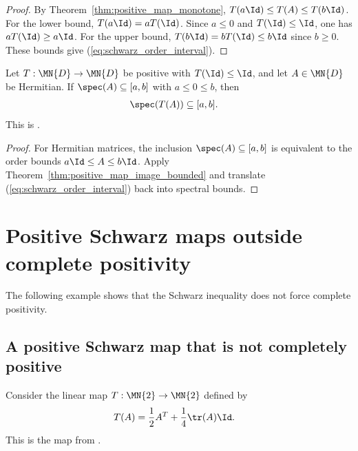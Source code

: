\begin{proof}
    \leanok
    By Theorem~\ref{thm:positive_map_monotone},
    $T(a\Id)\le T(A)\le T(b\Id)$.
    For the lower bound, $T(a\Id)=aT(\Id)$.
    Since $a\le0$ and $T(\Id)\le\Id$, one has $aT(\Id)\ge a\Id$.
    For the upper bound, $T(b\Id)=bT(\Id)\le b\Id$ since $b\ge0$.
    These bounds give (\ref{eq:schwarz_order_interval}).
\end{proof}

\begin{theorem}
    \label{thm:positive_map_spectrum_contractivity}
    \leanok
    Let $T:\MN{D}\to\MN{D}$ be positive with $T(\Id)\le\Id$, and let
    $A\in\MN{D}$ be Hermitian.
    If $\spec(A)\subseteq[a,b]$ with $a\le0\le b$, then
    \begin{align}
        \spec(T(A))
         & \subseteq[a,b].
        \notag
    \end{align}
    This is \cite[Equation~(5.21)]{Wolf2012Quantum}.
\end{theorem}

\begin{proof}
    \leanok
    For Hermitian matrices, the inclusion
    $\spec(A)\subseteq[a,b]$ is equivalent to the order bounds
    $a\Id\le A\le b\Id$.
    Apply Theorem~\ref{thm:positive_map_image_bounded} and translate
    (\ref{eq:schwarz_order_interval}) back into spectral bounds.
\end{proof}

\section{Positive Schwarz maps outside complete positivity}

The following example shows that the Schwarz inequality does not force complete
positivity.

\subsection{A positive Schwarz map that is not completely positive}

\begin{example}\label{def:wolf_example53}
    \leanok
    Consider the linear map $T : \MN{2} \to \MN{2}$ defined by
    \begin{align}
        T(A) & =\frac{1}{2} A^T+\frac{1}{4}\tr(A)\Id.
        \notag
    \end{align}
    This is the map from \cite[Example~5.3]{Wolf2012Quantum}.
\end{example}

